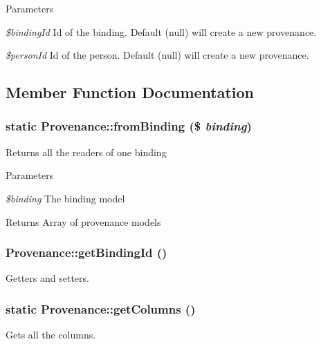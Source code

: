 \begin{DoxyParams}{Parameters}
\item[{\em \$bindingId}]Id of the binding. Default (null) will create a new provenance. \item[{\em \$personId}]Id of the person. Default (null) will create a new provenance. \end{DoxyParams}


\subsection{Member Function Documentation}
\hypertarget{classProvenance_a7514cb28de3123336f9f0bcc36b0fca7}{
\subsubsection[{fromBinding}]{\setlength{\rightskip}{0pt plus 5cm}static Provenance::fromBinding (\$ {\em binding})}}
\label{classProvenance_a7514cb28de3123336f9f0bcc36b0fca7}
Returns all the readers of one binding


\begin{DoxyParams}{Parameters}
\item[{\em \$binding}]The binding model \end{DoxyParams}
\begin{DoxyReturn}{Returns}
Array of provenance models 
\end{DoxyReturn}
\hypertarget{classProvenance_a5424205b774731f2d7593d3eb54e6139}{
\subsubsection[{getBindingId}]{\setlength{\rightskip}{0pt plus 5cm}Provenance::getBindingId ()}}
\label{classProvenance_a5424205b774731f2d7593d3eb54e6139}
Getters and setters. \hypertarget{classProvenance_a244657b40cc6b72dd868d25a2cafbe57}{
\subsubsection[{getColumns}]{\setlength{\rightskip}{0pt plus 5cm}static Provenance::getColumns ()}}
\label{classProvenance_a244657b40cc6b72dd868d25a2cafbe57}
Gets all the columns.

